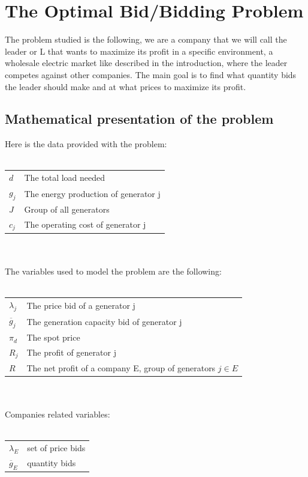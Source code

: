 \documentclass[letterpaper]{article}
\begin{document}
\section{The Optimal Bid/Bidding Problem}
The problem studied is the following, we are a company that we will call the leader or L that wants to maximize its profit in a specific environment, a wholesale electric market like described in the introduction, where the leader competes against other companies. The main goal is to find what quantity bids the leader should make and at what prices to maximize its profit.
\subsection{Mathematical presentation of the problem}
Here is the data provided with the problem: \\ \\ 
\begin{tabular}{ll}
$d$ & The total load needed \\
$g_j$ & The energy production of generator j \\ 
$J$ & Group of all generators \\
$c_j$ & The operating cost of generator j \\ 
\end{tabular}\\ \\
The variables used to model the problem are the following: \\ \\
\begin{tabular}{ll}
$\lambda_j$ & The price bid of a generator j \\ 
$\overline{g}_j$ & The generation capacity bid of generator j \\ 
$\pi_d$ & The spot price \\ 
$R_j$ & The profit of generator j \\ 
$R$ & The net profit of a company E, group of generators $j \in E$ \\
\end{tabular}\\ \\
Companies related variables: \\ \\
\begin{tabular}{ll}
$\lambda_E$ & set of price bids \\
$\overline{g}_E$ & quantity bids \\ 
\end{tabular}\\ \\
\end{document}
